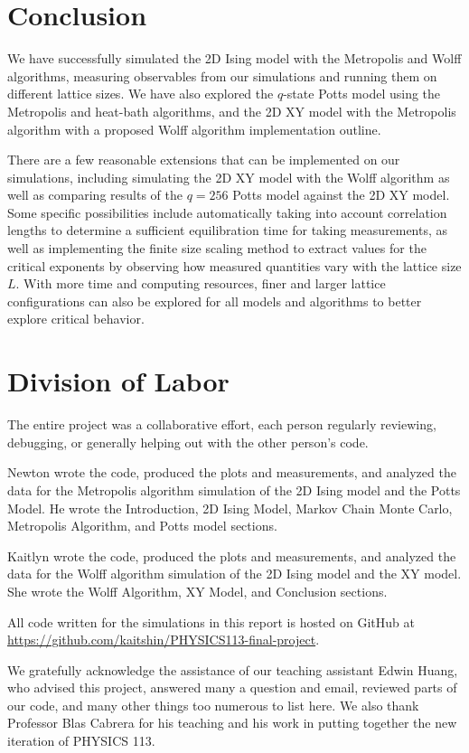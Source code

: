 \documentclass[twocolumn,aps]{revtex4-1} %
\begin{document}
\section{Conclusion}
We have successfully simulated the 2D Ising model with the Metropolis and Wolff algorithms, measuring observables from our simulations and running them on different lattice sizes. We have also explored the $q$-state Potts model using the Metropolis and heat-bath algorithms, and the 2D XY model with the Metropolis algorithm with a proposed Wolff algorithm implementation outline. 

There are a few reasonable extensions that can be implemented on our simulations, including simulating the 2D XY model with the Wolff algorithm as well as comparing results of the $q = 256$ Potts model against the 2D XY model. Some specific possibilities include automatically taking into account correlation lengths to determine a sufficient equilibration time for taking measurements, as well as implementing the finite size scaling method to extract values for the critical exponents by observing how measured quantities vary with the lattice size $L$. With more time and computing resources, finer and larger lattice configurations can also be explored for all models and algorithms to better explore critical behavior.

\section{Division of Labor}
The entire project was a collaborative effort, each person regularly reviewing, debugging, or generally helping out with the other person's code.

Newton wrote the code, produced the plots and measurements, and analyzed the data for the Metropolis algorithm simulation of the 2D Ising model and the Potts Model. He wrote the Introduction, 2D Ising Model, Markov Chain Monte Carlo, Metropolis Algorithm, and Potts model sections.

Kaitlyn wrote the code, produced the plots and measurements, and analyzed the data for the Wolff algorithm simulation of the 2D Ising model and the XY model. She wrote the Wolff Algorithm, XY Model, and Conclusion sections. 

All code written for the simulations in this report is hosted on GitHub at \url{https://github.com/kaitshin/PHYSICS113-final-project}.




\begin{acknowledgements}
We gratefully acknowledge the assistance of our teaching assistant Edwin Huang, who advised this project, answered many a question and email, reviewed parts of our code, and many other things too numerous to list here. We also thank Professor Blas Cabrera for his teaching and his work in putting together the new iteration of PHYSICS 113.
\end{acknowledgements}
\end{document}
